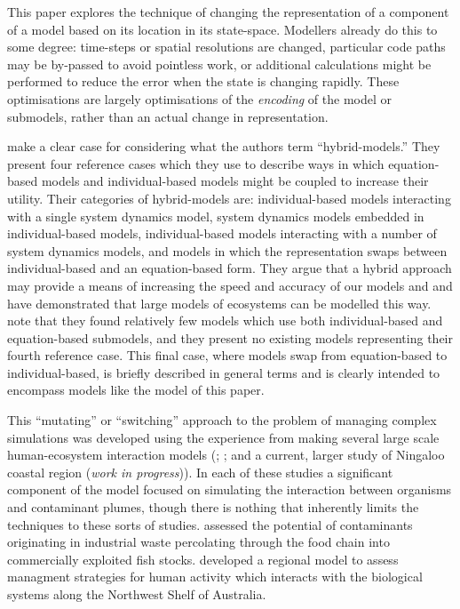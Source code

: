 This paper explores the technique of changing the representation of a
component of a model based on its location in its state-space. Modellers
already do this to some degree: time-steps or spatial resolutions are changed,
particular code paths may be by-passed to avoid pointless work, or additional
calculations might be performed to reduce the error when the state is changing
rapidly. These optimisations are largely optimisations of the
{\em{encoding}} of the model or submodels, rather than an actual change in
representation.

 make a clear case for considering what the authors term
``hybrid-models.'' They present four reference cases which they use to
describe ways in which equation-based models and individual-based models might
be coupled to increase their utility. Their categories of hybrid-models are:
individual-based models interacting with a single system dynamics model,
system dynamics models embedded in individual-based models, individual-based
models interacting with a number of system dynamics models, and models in
which the representation swaps between individual-based and an equation-based
form. They argue that a hybrid approach may provide a means of increasing the
speed and accuracy of our models and \citet{Lyne94:1} and \citet{Gray06:1} have
demonstrated that large models of ecosystems can be modelled this way.
\citeauthor{Vincenot11:1} note that they found relatively few models which use both
individual-based and equation-based submodels, and they present no existing
models representing their fourth reference case. This final case, where models
swap from equation-based to individual-based, is briefly described in general
terms and is clearly intended to encompass models like the model of this
paper.

This ``mutating'' or ``switching'' approach to the problem of managing
complex simulations was developed using the experience from making several
large scale human-ecosystem interaction models (\citeauthor{Lyne94:1};
\citeauthor{Gray06:1}; and a current, larger study of Ningaloo coastal region
({\em{work in progress}})). In each of these studies a significant component
of the model focused on simulating the interaction between organisms and
contaminant plumes, though there is nothing that inherently limits the
techniques to these sorts of studies.  assessed the
potential of contaminants originating in industrial waste percolating through
the food chain into commercially exploited fish stocks. \citeauthor{Gray06:1}
developed a regional model to assess managment strategies for human activity
which interacts with the biological systems along the Northwest Shelf of
Australia.

